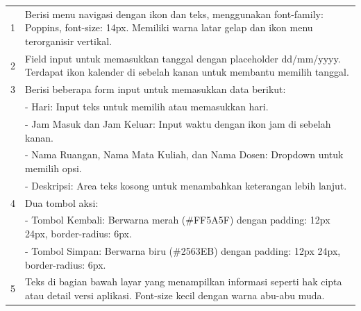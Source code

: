 \begin{enumerate}
\begin{longtable}{c p{}}
		      1                       & Berisi menu navigasi dengan ikon dan teks, menggunakan font-family: Poppins, font-size: 14px. Memiliki warna latar gelap dan ikon menu terorganisir vertikal. \\
		      2                       & Field input untuk memasukkan tanggal dengan placeholder dd/mm/yyyy. Terdapat ikon kalender di sebelah kanan untuk membantu memilih tanggal.                   \\
		      3                       & Berisi beberapa form input untuk memasukkan data berikut:                                                                                                     \\
		                              & - Hari: Input teks untuk memilih atau memasukkan hari.                                                                                                        \\
		                              & - Jam Masuk dan Jam Keluar: Input waktu dengan ikon jam di sebelah kanan.                                                                                     \\
		                              & - Nama Ruangan, Nama Mata Kuliah, dan Nama Dosen: Dropdown untuk memilih opsi.                                                                                \\
		                              & - Deskripsi: Area teks kosong untuk menambahkan keterangan lebih lanjut.                                                                                      \\
		      4                       & Dua tombol aksi:                                                                                                                                              \\
		                              & - Tombol Kembali: Berwarna merah (\#FF5A5F) dengan padding: 12px 24px, border-radius: 6px.                                                                    \\
		                              & - Tombol Simpan: Berwarna biru (\#2563EB) dengan padding: 12px 24px, border-radius: 6px.                                                                      \\
		      5                       & Teks di bagian bawah layar yang menampilkan informasi seperti hak cipta atau detail versi aplikasi. Font-size kecil dengan warna abu-abu muda.                \\
		      \hline
	      \end{longtable}


\end{enumerate}
